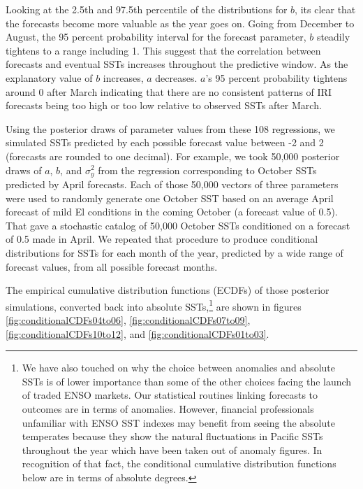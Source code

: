 \documentclass[article]{jss}
\begin{document}
Looking at the 2.5th and 97.5th percentile of the distributions for
\(b\), its clear that the forecasts become more valuable as the year
goes on. Going from December to August, the 95 percent probability
interval for the forecast parameter, \(b\) steadily tightens to a range
including 1. This suggest that the correlation between forecasts and
eventual SSTs increases throughout the predictive window. As the
explanatory value of \(b\) increases, \(a\) decreases. \(a\)'s 95
percent probability tightens around 0 after March indicating that there
are no consistent patterns of IRI forecasts being too high or too low
relative to observed SSTs after March.

Using the posterior draws of parameter values from these 108
regressions, we simulated SSTs predicted by each possible forecast value
between -2 and 2 (forecasts are rounded to one decimal). For example, we
took 50,000 posterior draws of \(a\), \(b\), and \(\sigma_{y}^2\) from
the regression corresponding to October SSTs predicted by April
forecasts. Each of those 50,000 vectors of three parameters were used to
randomly generate one October SST based on an average April forecast of
mild El  conditions in the coming October (a forecast value
of 0.5). That gave a stochastic catalog of 50,000 October SSTs
conditioned on a forecast of 0.5 made in April. We repeated that
procedure to produce conditional distributions for SSTs for each month
of the year, predicted by a wide range of forecast values, from all
possible forecast months.

The empirical cumulative distribution functions (ECDFs) of those
posterior simulations, converted back into absolute SSTs,\footnote{We
  have also touched on why the choice between anomalies and absolute
  SSTs is of lower importance than some of the other choices facing the
  launch of traded ENSO markets. Our statistical routines linking
  forecasts to outcomes are in terms of anomalies. However, financial
  professionals unfamiliar with ENSO SST indexes may benefit from seeing
  the absolute temperates because they show the natural fluctuations in
  Pacific SSTs throughout the year which have been taken out of anomaly
  figures. In recognition of that fact, the conditional cumulative
  distribution functions below are in terms of absolute degrees.} are
shown in figures \ref{fig:conditionalCDFs04to06},
\ref{fig:conditionalCDFs07to09}, \ref{fig:conditionalCDFs10to12}, and
\ref{fig:conditionalCDFs01to03}.
\end{document}

